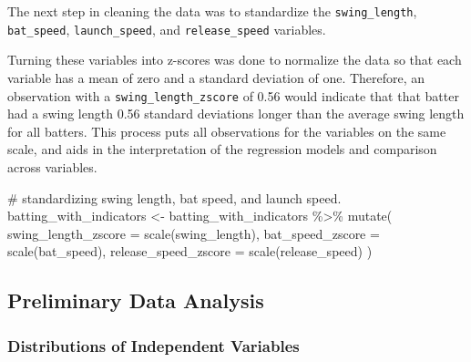 \documentclass[
  letterpaper,
  DIV=11,
  numbers=noendperiod]{scrartcl}
\newenvironment{Shaded}{\begin{snugshade}}{\end{snugshade}}
\newcommand{\AttributeTok}[1]{\textcolor[rgb]{0.40,0.45,0.13}{#1}}
\newcommand{\CommentTok}[1]{\textcolor[rgb]{0.37,0.37,0.37}{#1}}
\newcommand{\FunctionTok}[1]{\textcolor[rgb]{0.28,0.35,0.67}{#1}}
\newcommand{\NormalTok}[1]{\textcolor[rgb]{0.00,0.23,0.31}{#1}}
\newcommand{\OtherTok}[1]{\textcolor[rgb]{0.00,0.23,0.31}{#1}}
\newcommand{\SpecialCharTok}[1]{\textcolor[rgb]{0.37,0.37,0.37}{#1}}
\begin{document}
The next step in cleaning the data was to standardize the
\texttt{swing\_length}, \texttt{bat\_speed}, \texttt{launch\_speed}, and
\texttt{release\_speed} variables.

Turning these variables into z-scores was done to normalize the data so
that each variable has a mean of zero and a standard deviation of one.
Therefore, an observation with a \texttt{swing\_length\_zscore} of 0.56
would indicate that that batter had a swing length 0.56 standard
deviations longer than the average swing length for all batters. This
process puts all observations for the variables on the same scale, and
aids in the interpretation of the regression models and comparison
across variables.

\begin{Shaded}
\begin{Highlighting}[]
\CommentTok{\# standardizing swing length, bat speed, and launch speed. }
\NormalTok{batting\_with\_indicators }\OtherTok{\textless{}{-}}\NormalTok{ batting\_with\_indicators }\SpecialCharTok{\%\textgreater{}\%}
  \FunctionTok{mutate}\NormalTok{(}
    \AttributeTok{swing\_length\_zscore =} \FunctionTok{scale}\NormalTok{(swing\_length),}
    \AttributeTok{bat\_speed\_zscore =} \FunctionTok{scale}\NormalTok{(bat\_speed),}
    \AttributeTok{release\_speed\_zscore =} \FunctionTok{scale}\NormalTok{(release\_speed)}
\NormalTok{  )}
\end{Highlighting}
\end{Shaded}

\subsection{Preliminary Data Analysis}\label{preliminary-data-analysis}

\subsubsection{Distributions of Independent
Variables}\label{distributions-of-independent-variables}
\end{document}

